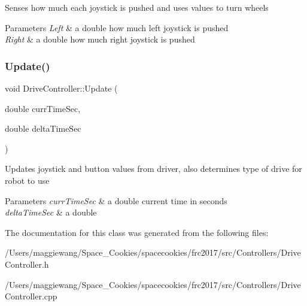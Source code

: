 Senses how much each joystick is pushed and uses values to turn wheels 
\begin{DoxyParams}{Parameters}
{\em Left} & a double how much left joystick is pushed \\
\hline
{\em Right} & a double how much right joystick is pushed \\
\hline
\end{DoxyParams}
\mbox{\label{class_drive_controller_aefc9e8cbe2948d2e72987e0a8a2cbf80}} 
\subsubsection{\texorpdfstring{Update()}{Update()}}
{\footnotesize\ttfamily void Drive\+Controller\+::\+Update (\begin{DoxyParamCaption}\item[{double}]{curr\+Time\+Sec,  }\item[{double}]{delta\+Time\+Sec }\end{DoxyParamCaption})}

Updates joystick and button values from driver, also determines type of drive for robot to use 
\begin{DoxyParams}{Parameters}
{\em curr\+Time\+Sec} & a double current time in seconds \\
\hline
{\em delta\+Time\+Sec} & a double \\
\hline
\end{DoxyParams}


The documentation for this class was generated from the following files\+:\begin{DoxyCompactItemize}
\item 
/\+Users/maggiewang/\+Space\+\_\+\+Cookies/spacecookies/frc2017/src/\+Controllers/Drive\+Controller.\+h\item 
/\+Users/maggiewang/\+Space\+\_\+\+Cookies/spacecookies/frc2017/src/\+Controllers/Drive\+Controller.\+cpp\end{DoxyCompactItemize}
